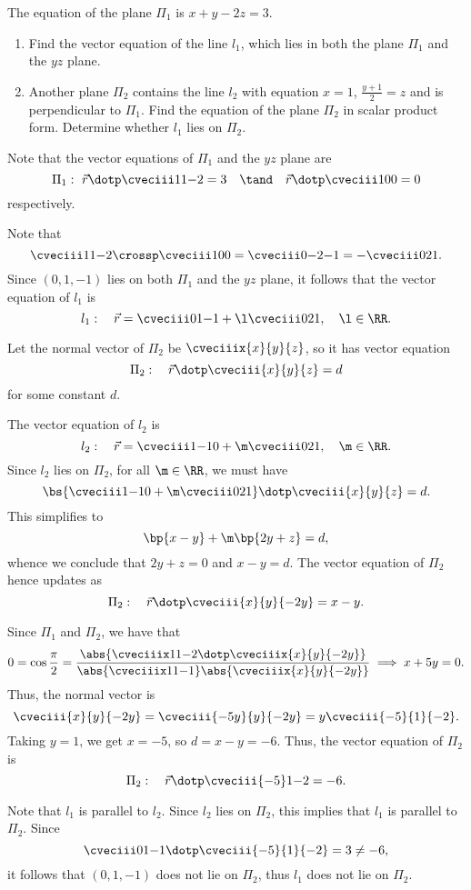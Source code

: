 \begin{problem}
    The equation of the plane $\Pi_1$ is $x + y - 2z = 3$.

    \begin{enumerate}
        \item Find the vector equation of the line $l_1$, which lies in both the plane $\Pi_1$ and the $yz$ plane.
        \item Another plane $\Pi_2$ contains the line $l_2$ with equation $x = 1$, $\frac{y+1}{2} = z$ and is perpendicular to $\Pi_1$. Find the equation of the plane $\Pi_2$ in scalar product form. Determine whether $l_1$ lies on $\Pi_2$.
    \end{enumerate}
\end{problem}
\begin{solution}
    Note that the vector equations of $\Pi_1$ and the $yz$ plane are \[\Pi_1: \, \, \vec r \dotp \cveciii11{-2} = 3 \quad \tand \quad \vec r \dotp \cveciii100 = 0\] respectively.

    \begin{ppart}
        Note that \[\cveciii11{-2} \crossp \cveciii100 = \cveciii0{-2}{-1} = -\cveciii021.\] Since $(0, 1, -1)$ lies on both $\Pi_1$ and the $yz$ plane, it follows that the vector equation of $l_1$ is \[l_1: \quad \vec r = \cveciii01{-1} + \l \cveciii021, \quad \l \in \RR.\]
    \end{ppart}
    \begin{ppart}
        Let the normal vector of $\Pi_2$ be $\cveciiix{x}{y}{z}$, so it has vector equation \[\Pi_2: \quad \vec r \dotp \cveciii{x}{y}{z} = d\] for some constant $d$.

        The vector equation of $l_2$ is \[l_2: \quad \vec r = \cveciii1{-1}0 + \m \cveciii021, \quad \m \in \RR.\] Since $l_2$ lies on $\Pi_2$, for all $\m \in \RR$, we must have \[\bs{\cveciii1{-1}0 + \m \cveciii021} \dotp \cveciii{x}{y}{z} = d.\] This simplifies to \[\bp{x-y} + \m \bp{2y + z} = d,\] whence we conclude that $2y + z = 0$ and $x - y = d$. The vector equation of $\Pi_2$ hence updates as \[\Pi_2: \quad \vec r \dotp \cveciii{x}{y}{-2y} = x - y.\]

        Since $\Pi_1$ and $\Pi_2$, we have that \[0 = \cos \frac\pi2 = \frac{\abs{\cveciiix11{-2} \dotp \cveciiix{x}{y}{-2y}}}{\abs{\cveciiix11{-1}} \abs{\cveciiix{x}{y}{-2y}}} \implies x + 5y = 0.\] Thus, the normal vector is \[\cveciii{x}{y}{-2y} = \cveciii{-5y}{y}{-2y} = y\cveciii{-5}{1}{-2}.\] Taking $y = 1$, we get $x = -5$, so $d = x-y = -6$. Thus, the vector equation of $\Pi_2$ is \[\Pi_2: \quad \vec r \dotp \cveciii{-5}1{-2} = -6.\]

        Note that $l_1$ is parallel to $l_2$. Since $l_2$ lies on $\Pi_2$, this implies that $l_1$ is parallel to $\Pi_2$. Since \[\cveciii01{-1} \dotp \cveciii{-5}{1}{-2} = 3 \neq -6,\] it follows that $(0, 1, -1)$ does not lie on $\Pi_2$, thus $l_1$ does not lie on $\Pi_2$.
    \end{ppart}
\end{solution}

